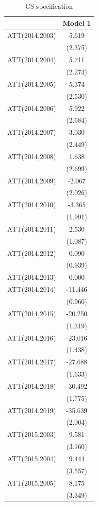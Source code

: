 \documentclass[
  12pt,
]{article}
\begin{document}
\begin{table}

\caption{\label{tab:table-4}CS specification}
\centering
\begin{tabular}[t]{lc}
\toprule
  & Model 1\\
\midrule
ATT(2014,2003) & 5.619\\
 & (2.375)\\
ATT(2014,2004) & 5.711\\
 & (2.274)\\
ATT(2014,2005) & 5.374\\
 & (2.530)\\
ATT(2014,2006) & 5.922\\
 & (2.684)\\
ATT(2014,2007) & 3.030\\
 & (2.449)\\
ATT(2014,2008) & 1.638\\
 & (2.699)\\
ATT(2014,2009) & -2.067\\
 & (2.026)\\
ATT(2014,2010) & -3.365\\
 & (1.991)\\
ATT(2014,2011) & 2.530\\
 & (1.087)\\
ATT(2014,2012) & 0.090\\
 & (0.939)\\
ATT(2014,2013) & 0.000\\
ATT(2014,2014) & -11.446\\
 & (0.960)\\
ATT(2014,2015) & -20.250\\
 & (1.319)\\
ATT(2014,2016) & -23.016\\
 & (1.438)\\
ATT(2014,2017) & -27.688\\
 & (1.633)\\
ATT(2014,2018) & -30.492\\
 & (1.775)\\
ATT(2014,2019) & -35.639\\
 & (2.004)\\
ATT(2015,2003) & 9.581\\
 & (3.160)\\
ATT(2015,2004) & 9.444\\
 & (3.557)\\
ATT(2015,2005) & 8.175\\
 & (3.349)\\

\end{tabular}
\end{table}
\end{document}
